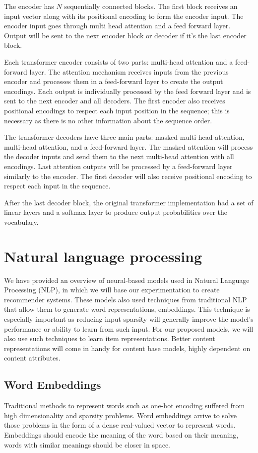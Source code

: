 \documentclass{kththesis}
\begin{document}
The encoder has $N$ sequentially connected blocks. The first block receives an input vector along with its positional encoding to form the encoder input. The encoder input goes through multi head attention and a feed forward layer. Output will be sent to the next encoder block or decoder if it's the last encoder block. 

Each transformer encoder consists of two parts: multi-head attention and a feed-forward layer. The attention mechanism receives inputs from the previous encoder and processes them in a feed-forward layer to create the output encodings. Each output is individually processed by the feed forward layer and is sent to the next encoder and all decoders. The first encoder also receives positional encodings to respect each input position in the sequence; this is necessary as there is no other information about the sequence order.

The transformer decoders have three main parts: masked multi-head attention, multi-head attention, and a feed-forward layer. The masked attention will process the decoder inputs and send them to the next multi-head attention with all encodings. Last attention outputs will be processed by a feed-forward layer similarly to the encoder. The first decoder will also receive positional encoding to respect each input in the sequence.

After the last decoder block, the original transformer implementation had a set of linear layers and a softmax layer to produce output probabilities over the vocabulary.

\section{Natural language processing}
We have provided an overview of neural-based models used in Natural Language Processing (NLP), in which we will base our experimentation to create recommender systems. These models also used techniques from traditional NLP that allow them to generate word representations, embeddings. This technique is especially important as reducing input sparsity will generally improve the model's performance or ability to learn from such input. For our proposed models, we will also use such techniques to learn item representations. Better content representations will come in handy for content base models, highly dependent on content attributes.

\subsection{Word Embeddings}\label{Embeddings}
Traditional methods to represent words such as one-hot encoding suffered from high dimensionality and sparsity problems. Word embeddings arrive to solve those problems in the form of a dense real-valued vector to represent words. Embeddings should encode the meaning of the word based on their meaning, words with similar meanings should be closer in space.
\end{document}
